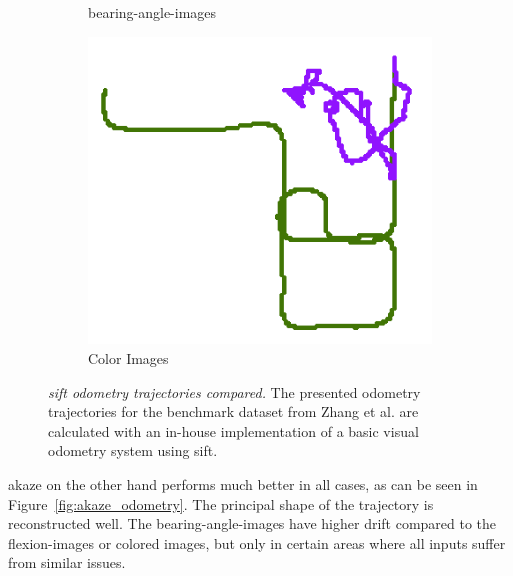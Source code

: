 \begin{figure}[t]
\begin{subfigure}[b]{0.31\linewidth}
    \caption{\glspl{bearing-angle-image}}
\end{subfigure}%
\begin{subfigure}[b]{0.31\linewidth}
    \includegraphics[width=0.8\linewidth]{chapter06/odo/zhang_pinhole_SIFT_nice.png}%
    \caption{Color Images}
\end{subfigure}
\caption[\acrshort{sift} odometry trajectories compared]{\emph{\acrshort{sift} odometry trajectories compared.} The presented odometry trajectories for the benchmark dataset from Zhang et al.\cite{zhang_icra2016} are calculated with an in-house implementation of a basic visual odometry system using \acrshort{sift}.}\label{fig:sift_odometry}
\end{figure}
\acrshort{akaze} on the other hand performs much better in all cases, as can be seen in Figure~\ref{fig:akaze_odometry}.
The principal shape of the trajectory is reconstructed well.
The \glspl{bearing-angle-image} have higher drift compared to the \glspl{flexion-image} or colored images, but only in certain areas where all inputs suffer from similar issues.
